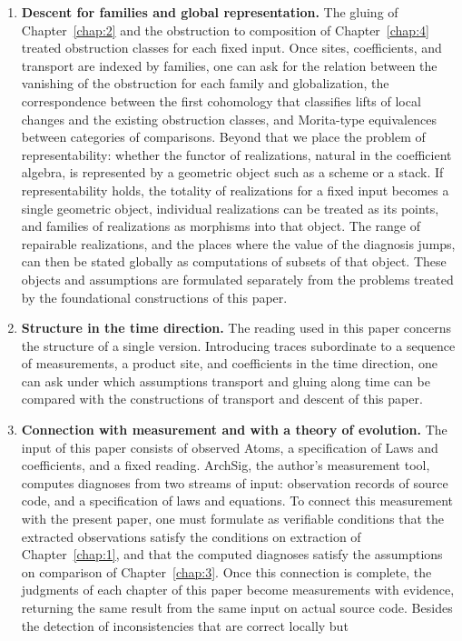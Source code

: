 \begin{enumerate}
\item \textbf{Descent for families and global representation.} The gluing of
Chapter~\ref{chap:2} and the obstruction to composition of Chapter~\ref{chap:4} treated
obstruction classes for each fixed input. Once sites, coefficients, and transport are
indexed by families, one can ask for the relation between the vanishing of the obstruction
for each family and globalization, the correspondence between the first cohomology that
classifies lifts of local changes and the existing obstruction classes, and Morita-type
equivalences between categories of comparisons. Beyond that we place the problem of
representability: whether the functor of realizations, natural in the coefficient algebra,
is represented by a geometric object such as a scheme or a stack.
If representability holds, the totality of realizations for a fixed input becomes a single
geometric object, individual realizations can be treated as its points, and families of
realizations as morphisms into that object. The range of repairable realizations, and the places
where the value of the diagnosis jumps, can then be stated globally as computations of
subsets of that object.
These objects and assumptions are formulated separately from the problems treated by the
foundational constructions of this paper.
\item \textbf{Structure in the time direction.} The reading used in this paper concerns the
structure of a single version. Introducing traces subordinate to a sequence of measurements,
a product site, and coefficients in the time direction, one can ask under which assumptions
transport and gluing along time can be compared with the constructions of transport and
descent of this paper.
\item \textbf{Connection with measurement and with a theory of evolution.} The input of this
paper consists of observed Atoms, a specification of Laws and coefficients, and a fixed
reading. ArchSig, the author's measurement tool, computes diagnoses from two streams of
input: observation records of source code, and a specification of laws and equations. To
connect this measurement with the present paper, one must formulate as verifiable conditions
that the extracted observations satisfy the conditions on extraction of
Chapter~\ref{chap:1}, and that the computed diagnoses satisfy the assumptions on comparison
of Chapter~\ref{chap:3}. Once this connection is complete, the judgments of each chapter of
this paper become measurements with evidence, returning the same result from the same input
on actual source code. Besides the detection of inconsistencies that are correct locally but

\end{enumerate}
